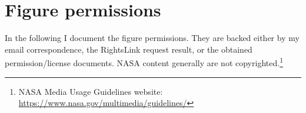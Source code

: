 
\renewcommand\listfigurename{List of Figures and their permissions}
\lofimagetrue
\listoffigures

\section*{Figure permissions}
In the following I document the figure permissions. They are backed either by my email correspondence, the RightsLink request result, or the obtained permission/license documents. NASA content generally are not copyrighted.\footnote{NASA Media Usage Guidelines website: \url{https://www.nasa.gov/multimedia/guidelines/}}

% 	
% 	
% 	

